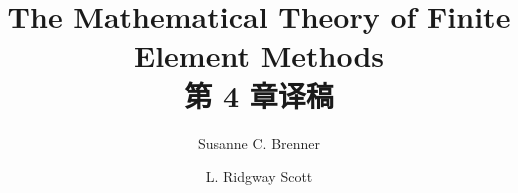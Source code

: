 \documentclass[a4paper,UTF8,12pt]{ctexart}
\title{The Mathematical Theory of Finite Element Methods\\第 4 章译稿}
\author{Susanne C. Brenner \and L. Ridgway Scott}
\date{}
\begin{document}
\maketitle
\setcounter{section}{3}
\renewcommand{\thethmcount}{\thesubsection.\arabic{thmcount}}
\renewcommand{\theequation}{\thesubsection.\arabic{equation}}
\renewcommand{\thefigure}{\thesection.\arabic{figure}}
\renewcommand{\thetable}{\thesection.\arabic{table}}

\end{document}
